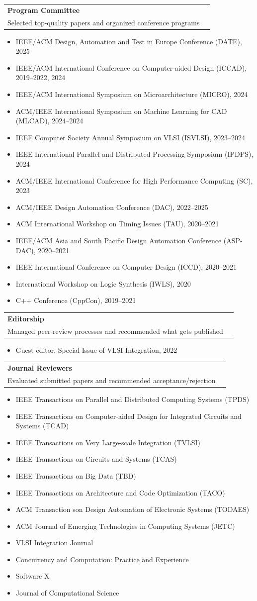 \documentclass[A4,11pt]{article}
\makeatletter
\newcommand{\CVItem}[1]{
  \item\small{
    {#1 \vspace{-2pt}}
  }
}
\newcommand{\CVSubheading}[4]{
  \vspace{-2pt}\item
    \begin{tabular*}{0.97\textwidth}[t]{l@{\extracolsep{\fill}}r}
      \textbf{#1} & #2 \\
      \small#3 & \small #4 \\
    \end{tabular*}\vspace{-7pt}
}
\newcommand{\CVItemListStart}{\begin{itemize}}
\newcommand{\CVItemListEnd}{\end{itemize}\vspace{-5pt}}
\makeatother
\begin{document}
    \CVSubheading
      {Program Committee}{}
      {Selected top-quality papers and organized conference programs}{}
      \CVItemListStart
        \CVItem{IEEE/ACM Design, Automation and Test in Europe Conference (DATE), 2025}
        \CVItem{IEEE/ACM International Conference on Computer-aided Design (ICCAD), 2019--2022, 2024}
        \CVItem{IEEE/ACM International Symposium on Microarchitecture (MICRO), 2024}
        \CVItem{ACM/IEEE International Symposium on Machine Learning for CAD (MLCAD), 2024--2024}
        \CVItem{IEEE Computer Society Annual Symposium on VLSI (ISVLSI), 2023--2024}
        \CVItem{IEEE International Parallel and Distributed Processing Symposium (IPDPS), 2024}
        \CVItem{ACM/IEEE International Conference for High Performance Computing (SC), 2023}
        \CVItem{ACM/IEEE Design Automation Conference (DAC), 2022--2025}
        \CVItem{ACM International Workshop on Timing Issues (TAU), 2020--2021}
        \CVItem{IEEE/ACM Asia and South Pacific Design Automation Conference (ASP-DAC), 2020--2021}
        \CVItem{IEEE International Conference on Computer Design (ICCD), 2020--2021}
        \CVItem{International Workshop on Logic Synthesis (IWLS), 2020}
        \CVItem{C++ Conference (CppCon), 2019--2021}
      \CVItemListEnd
    
    \CVSubheading
      {Editorship}{}
      {Managed peer-review processes and recommended what gets published}{}
      \CVItemListStart
        \CVItem{Guest editor, Special Issue of VLSI Integration, 2022}
      \CVItemListEnd
    
    \CVSubheading
      {Journal Reviewers}{}
      {Evaluated submitted papers and recommended acceptance/rejection}{}
      \CVItemListStart
        \CVItem{IEEE Transactions on Parallel and Distributed Computing Systems (TPDS)}
        \CVItem{IEEE Transactions on Computer-aided Design for Integrated Circuits and Systems (TCAD)}
        \CVItem{IEEE Transactions on Very Large-scale Integration (TVLSI)}
        \CVItem{IEEE Transactions on Circuits and Systems (TCAS)}
        \CVItem{IEEE Transactions on Big Data (TBD)}
        \CVItem{IEEE Transactions on Architecture and Code Optimization (TACO)}
        \CVItem{ACM Transaction son Design Automation of Electronic Systems (TODAES)}
        \CVItem{ACM Journal of Emerging Technologies in Computing Systems (JETC)}
        \CVItem{VLSI Integration Journal}
        \CVItem{Concurrency and Computation: Practice and Experience}
        \CVItem{Software X}
        \CVItem{Journal of Computational Science}
      \CVItemListEnd
    
\end{document}
